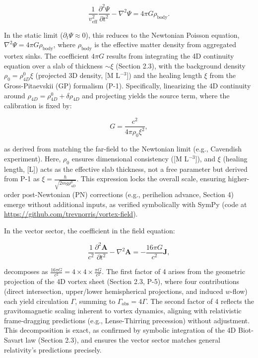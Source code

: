 \[
\frac{1}{v_{\text{eff}}^2} \frac{\partial^2 \Psi}{\partial t^2} - \nabla^2 \Psi = 4\pi G \rho_{\text{body}}.
\]

In the static limit ($\partial_t \Psi \approx 0$), this reduces to the Newtonian Poisson equation, $\nabla^2 \Psi = 4\pi G \rho_{\text{body}}$, where $\rho_{\text{body}}$ is the effective matter density from aggregated vortex sinks. The coefficient $4\pi G$ results from integrating the 4D continuity equation over a slab of thickness $\sim \xi$ (Section 2.3), with the background density $\rho_0 = \rho_{4D}^0 \xi$ (projected 3D density, [M L$^{-3}$]) and the healing length $\xi$ from the Gross-Pitaevskii (GP) formalism (P-1). Specifically, linearizing the 4D continuity around $\rho_{4D} = \rho_{4D}^0 + \delta \rho_{4D}$ and projecting yields the source term, where the calibration is fixed by:

\[
G = \frac{c^2}{4\pi \rho_0 \xi^2},
\]

as derived from matching the far-field to the Newtonian limit (e.g., Cavendish experiment). Here, $\rho_0$ ensures dimensional consistency ([M L$^{-3}$]), and $\xi$ (healing length, [L]) acts as the effective slab thickness, not a free parameter but derived from P-1 as $\xi = \frac{\hbar}{\sqrt{2 m g \rho_{4D}^0}}$. This expression locks the overall scale, ensuring higher-order post-Newtonian (PN) corrections (e.g., perihelion advance, Section 4) emerge without additional inputs, as verified symbolically with SymPy (code at \url{https://github.com/trevnorris/vortex-field}).

In the vector sector, the coefficient in the field equation:

\[
\frac{1}{c^2} \frac{\partial^2 \mathbf{A}}{\partial t^2} - \nabla^2 \mathbf{A} = -\frac{16\pi G}{c^2} \mathbf{J},
\]

decomposes as $\frac{16\pi G}{c^2} = 4 \times 4 \times \frac{\pi G}{c^2}$. The first factor of 4 arises from the geometric projection of the 4D vortex sheet (Section 2.3, P-5), where four contributions (direct intersection, upper/lower hemispherical projections, and induced $w$-flow) each yield circulation $\Gamma$, summing to $\Gamma_{\text{obs}} = 4\Gamma$. The second factor of 4 reflects the gravitomagnetic scaling inherent to vortex dynamics, aligning with relativistic frame-dragging predictions (e.g., Lense-Thirring precession) without adjustment. This decomposition is exact, as confirmed by symbolic integration of the 4D Biot-Savart law (Section 2.3), and ensures the vector sector matches general relativity’s predictions precisely.


